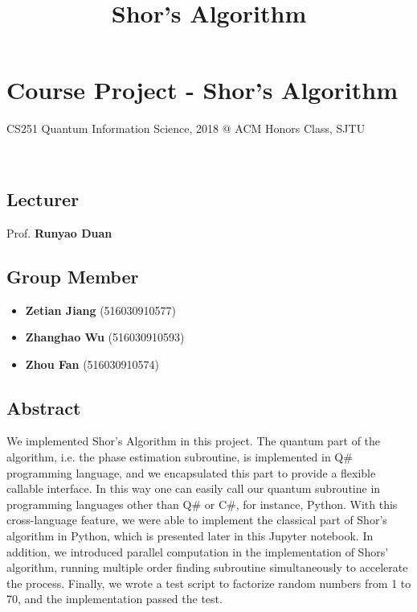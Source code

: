 \documentclass[11pt]{article}
\title{Shor's Algorithm}
\providecommand{\tightlist}{%
      \setlength{\itemsep}{0pt}\setlength{\parskip}{0pt}}
\begin{document}
    
    
    \maketitle
    
    

    
    \section{Course Project - Shor's
Algorithm}\label{course-project---shors-algorithm}

CS251 Quantum Information Science, 2018 @ ACM Honors Class, SJTU

\(\newcommand{\ket}[1]{\left|{#1}\right\rangle} \newcommand{\bra}[1]{\left\langle{#1}\right|}\)

\subsection{Lecturer}\label{lecturer}

Prof. \textbf{Runyao Duan}

\subsection{Group Member}\label{group-member}

\begin{itemize}
\tightlist
\item
  \textbf{Zetian Jiang} (516030910577)
\item
  \textbf{Zhanghao Wu} (516030910593)
\item
  \textbf{Zhou Fan} (516030910574)
\end{itemize}

\subsection{Abstract}\label{abstract}

We implemented Shor's Algorithm in this project. The quantum part of the
algorithm, i.e. the phase estimation subroutine, is implemented in Q\#
programming language, and we encapsulated this part to provide a
flexible callable interface. In this way one can easily call our quantum
subroutine in programming languages other than Q\# or C\#, for instance,
Python. With this cross-language feature, we were able to implement the
classical part of Shor's algorithm in Python, which is presented later
in this Jupyter notebook. In addition, we introduced parallel
computation in the implementation of Shors' algorithm, running multiple
order finding subroutine simultaneously to accelerate the process.
Finally, we wrote a test script to factorize random numbers from 1 to
70, and the implementation passed the test.
\end{document}

